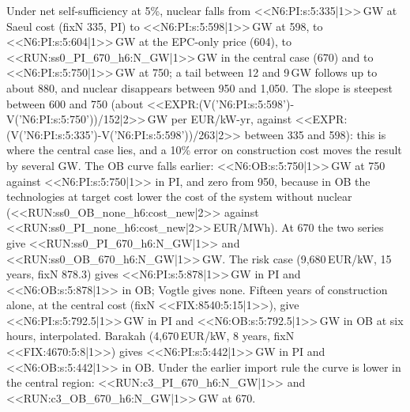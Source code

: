 Under net self-sufficiency at 5\%, nuclear falls from <<N6:PI:s:5:335|1>>\,GW at Saeul cost (fixN 335, PI) to <<N6:PI:s:5:598|1>>\,GW at 598, to <<N6:PI:s:5:604|1>>\,GW at the EPC-only price (604), to <<RUN:ss0_PI_670_h6:N_GW|1>>\,GW in the central case (670) and to <<N6:PI:s:5:750|1>>\,GW at 750; a tail between 12 and 9\,GW follows up to about 880, and nuclear disappears between 950 and 1{,}050. The slope is steepest between 600 and 750 (about <<EXPR:(V('N6:PI:s:5:598')-V('N6:PI:s:5:750'))/152|2>>\,GW per EUR/kW-yr, against <<EXPR:(V('N6:PI:s:5:335')-V('N6:PI:s:5:598'))/263|2>> between 335 and 598): this is where the central case lies, and a 10\% error on construction cost moves the result by several GW. The OB curve falls earlier: <<N6:OB:s:5:750|1>>\,GW at 750 against <<N6:PI:s:5:750|1>> in PI, and zero from 950, because in OB the technologies at target cost lower the cost of the system without nuclear (<<RUN:ss0_OB_none_h6:cost_new|2>> against <<RUN:ss0_PI_none_h6:cost_new|2>>\,EUR/MWh). At 670 the two series give <<RUN:ss0_PI_670_h6:N_GW|1>> and <<RUN:ss0_OB_670_h6:N_GW|1>>\,GW. The risk case (9{,}680\,EUR/kW, 15 years, fixN 878.3) gives <<N6:PI:s:5:878|1>>\,GW in PI and <<N6:OB:s:5:878|1>> in OB; Vogtle gives none. Fifteen years of construction alone, at the central cost (fixN <<FIX:8540:5:15|1>>), give <<N6:PI:s:5:792.5|1>>\,GW in PI and <<N6:OB:s:5:792.5|1>>\,GW in OB at six hours, interpolated. Barakah (4{,}670\,EUR/kW, 8 years, fixN <<FIX:4670:5:8|1>>) gives <<N6:PI:s:5:442|1>>\,GW in PI and <<N6:OB:s:5:442|1>> in OB. Under the earlier import rule the curve is lower in the central region: <<RUN:c3_PI_670_h6:N_GW|1>> and <<RUN:c3_OB_670_h6:N_GW|1>>\,GW at 670.

